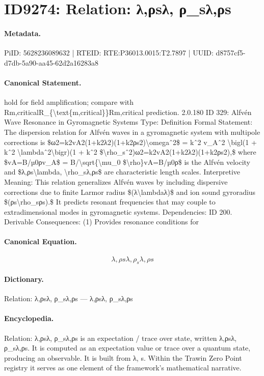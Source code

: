 \section*{ID9274: Relation: λ,ρsλ, ρ\_sλ,ρs}
\paragraph{Metadata.}
PiID: 5628236089632 | RTEID: RTE:P36013.0015:T2.7897 | UUID: d8757cf5-d7db-5a90-aa45-62d2a16283a8

\paragraph{Canonical Statement.}
hold for field amplification; compare with Rm,criticalR\_\{\textbackslash{}text\{m,critical\}\}Rm,critical prediction. 2.0.180 ID 329: Alfvén Wave Resonance in Gyromagnetic Systems Type: Definition Formal Statement: The dispersion relation for Alfvén waves in a gyromagnetic system with multipole corrections is \$ω2=k2vA2(1+k2λ2)(1+k2ρs2)\textbackslash{}omegaˆ2\$ = kˆ2 v\_Aˆ2 \textbackslash{}bigl(1 + kˆ2 \textbackslash{}lambdaˆ2\textbackslash{}bigr)(1 + kˆ2 \$\textbackslash{}rho\_sˆ2)ω2=k2vA2(1+k2λ2)(1+k2ρs2),\$ where \$vA=B/µ0ρv\_A\$ = B/\textbackslash{}sqrt\{\textbackslash{}mu\_0 \$\textbackslash{}rho\}vA=B/µ0ρ\$ is the Alfvén velocity and \$λ,ρs\textbackslash{}lambda, \textbackslash{}rho\_sλ,ρs\$ are characteristic length scales. Interpretive Meaning: This relation generalizes Alfvén waves by including dispersive corrections due to finite Larmor radius \$(λ\textbackslash{}lambdaλ)\$ and ion sound gyroradius \$(ρs\textbackslash{}rho\_sρs).\$ It predicts resonant frequencies that may couple to extradimensional modes in gyromagnetic systems. Dependencies: ID 200. Derivable Consequences: (1) Provides resonance conditions for

\paragraph{Canonical Equation.}
\[
λ,ρs\lambda, \rho_sλ,ρs
\]

\paragraph{Dictionary.}
Relation: λ,ρsλ, ρ\_sλ,ρs — λ,ρsλ, ρ\_sλ,ρs

\paragraph{Encyclopedia.}
Relation: λ,ρsλ, ρ\_sλ,ρs is an expectation / trace over state, written λ,ρsλ, ρ\_sλ,ρs. It is computed as an expectation value or trace over a quantum state, producing an observable. It is built from λ, s. Within the Trawin Zero Point registry it serves as one element of the framework's mathematical narrative.
